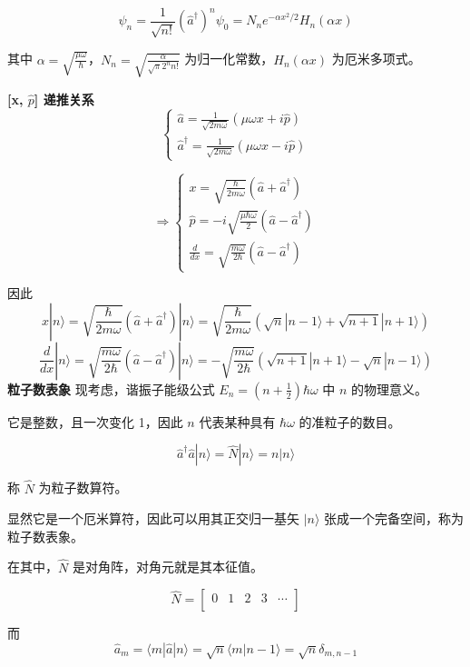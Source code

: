 \documentclass[lang=cn,10pt]{elegantbook}
\begin{document}
\[
\psi_n = \frac{1}{\sqrt{n!}} (\hat{a}^\dagger)^n \psi_0 = N_n e^{-\alpha x^2/2} H_n(\alpha x)
\]

其中 \(\alpha = \sqrt{\frac{\mu \omega}{\hbar}}\)，\(N_n = \sqrt{\frac{\alpha}{\sqrt{\pi} 2^n n!}}\) 为归一化常数，\(H_n(\alpha x)\) 为厄米多项式。

\textbf{[x, \(\hat{p}\)] 递推关系}
\[
\left\{
\begin{array}{l}
	\hat{a} = \frac{1}{\sqrt{2m\omega}} (\mu \omega x + i \hat{p}) \\
	\hat{a}^\dagger = \frac{1}{\sqrt{2m\omega}} (\mu \omega x - i \hat{p})
\end{array}
\right.
\]

\[
\Rightarrow
\left\{
\begin{array}{l}
	x = \sqrt{\frac{\hbar}{2m\omega}} (\hat{a} + \hat{a}^\dagger) \\
	\hat{p} = -i \sqrt{\frac{\mu \hbar \omega}{2}} (\hat{a} - \hat{a}^\dagger) \\
	\frac{d}{dx} = \sqrt{\frac{m\omega}{2\hbar}} (\hat{a} - \hat{a}^\dagger)
\end{array}
\right.
\]

因此
\[
x |n\rangle = \sqrt{\frac{\hbar}{2m\omega}} (\hat{a} + \hat{a}^\dagger) |n\rangle = \sqrt{\frac{\hbar}{2m\omega}} (\sqrt{n} |n-1\rangle + \sqrt{n+1} |n+1\rangle)
\]
\[
\frac{d}{dx} |n\rangle = \sqrt{\frac{m\omega}{2\hbar}} (\hat{a} - \hat{a}^\dagger) |n\rangle =- \sqrt{\frac{m\omega}{2\hbar}} (\sqrt{n+1} |n+1\rangle - \sqrt{n} |n-1\rangle)
\]
\textbf{粒子数表象}
现考虑，谐振子能级公式 \( E_n = \left(n + \frac{1}{2}\right) \hbar \omega \) 中 \( n \) 的物理意义。

它是整数，且一次变化 1，因此 \( n \) 代表某种具有 \( \hbar \omega \) 的准粒子的数目。

\[
\hat{a}^\dagger \hat{a} |n\rangle = \hat{N} |n\rangle = n |n\rangle
\]

称 \( \hat{N} \) 为粒子数算符。

显然它是一个厄米算符，因此可以用其正交归一基矢 \( |n\rangle \) 张成一个完备空间，称为粒子数表象。

在其中，\( \hat{N} \) 是对角阵，对角元就是其本征值。

\[
\hat{N} = \begin{bmatrix}
	0 & 1 & 2 & 3 & \cdots \\
\end{bmatrix}
\]

而
\[
\hat{a}_m = \langle m | \hat{a} | n \rangle = \sqrt{n} \langle m | n-1 \rangle = \sqrt{n} \delta_{m, n-1}
\]
\end{document}
